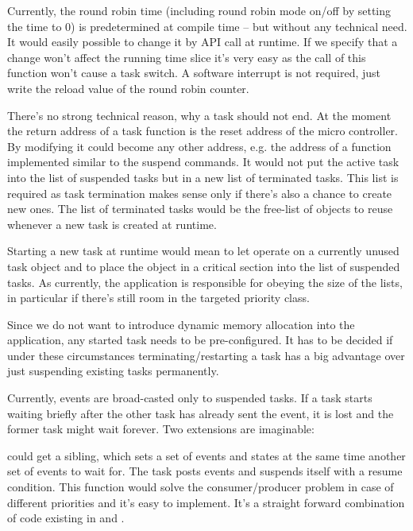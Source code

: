 Currently, the round robin time (including round robin mode on/off by
setting the time to 0) is predetermined at compile time -- but without any
technical need. It would easily possible to change it by API call at
runtime. If we specify that a change won't affect the running time slice
it's very easy as the call of this function won't cause a task switch. A
software interrupt is not required, just write the reload value of the
round robin counter.

There's no strong technical reason, why a task should not end. At the
moment the return address of a task function is the reset address of the
micro controller. By modifying  it could become any other
address, e.g. the address of a function implemented similar to the suspend
commands. It would not put the active task into the list of suspended
tasks but in a new list of terminated tasks. This list is required as task
termination makes sense only if there's also a chance to create new ones.
The list of terminated tasks would be the free-list of objects to reuse
whenever a new task is created at runtime.

Starting a new task at runtime would mean to let 
operate on a currently unused task object and to place the object in a
critical section into the list of suspended tasks. As currently, the
application is responsible for obeying the size of the lists, in
particular if there's still room in the targeted priority class.

Since we do not want to introduce dynamic memory allocation into the
application, any started task needs to be pre-configured. It has to be
decided if under these circumstances terminating/restarting a task has a
big advantage over just suspending existing tasks permanently.

Currently, events are broad-casted only to suspended tasks. If a task
starts waiting briefly after the other task has already sent the event, it
is lost and the former task might wait forever. Two extensions are
imaginable:

 could get a sibling, which sets a set of events and
states at the same time another set of events to wait for. The task posts
events and suspends itself with a resume condition. This function would
solve the consumer/producer problem in case of different priorities and
it's easy to implement. It's a straight forward combination of code
existing in  and .

